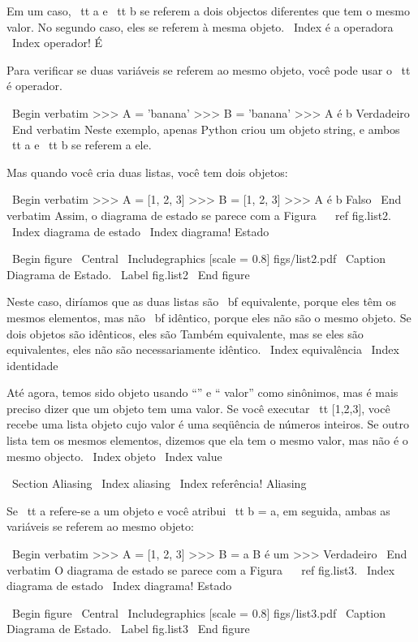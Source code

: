 \documentclass[10pt]{book}
\begin{document}
\begin {itemize}
{{{{{{{Em um caso, {\ tt a} e {\ tt b} se referem a dois objectos diferentes que
tem o mesmo valor. No segundo caso, eles se referem à mesma
objeto.
\ Index {} é a operadora
\ Index {operador! É}

Para verificar se duas variáveis ​​se referem ao mesmo objeto, você pode
usar o {\ tt é} operador.

\ Begin {verbatim}
>>> A = 'banana'
>>> B = 'banana'
>>> A é b
Verdadeiro
\ End {verbatim}
%
Neste exemplo, apenas Python criou um objeto string,
e ambos {\ tt a} e {\ tt b} se referem a ele.

Mas quando você cria duas listas, você tem dois objetos:

\ Begin {verbatim}
>>> A = [1, 2, 3]
>>> B = [1, 2, 3]
>>> A é b
Falso
\ End {verbatim}
%
Assim, o diagrama de estado se parece com a Figura ~ \ ref {} fig.list2.
\ Index {diagrama de estado}
\ Index {diagrama! Estado}

\ Begin {figure}
\ Central
{\ Includegraphics [scale = 0.8] {figs/list2.pdf}}
\ Caption {Diagrama de Estado.}
\ Label {} fig.list2
\ End {figure}


Neste caso, diríamos que as duas listas são {\ bf equivalente},
porque eles têm os mesmos elementos, mas não {\ bf idêntico}, porque
eles não são o mesmo objeto. Se dois objetos são idênticos, eles são
Também equivalente, mas se eles são equivalentes, eles não são necessariamente
idêntico.
\ Index {equivalência}
\ Index {identidade}

Até agora, temos sido objeto usando ``'' e `` valor''
como sinônimos, mas é mais preciso dizer que um objeto tem uma
valor. Se você executar {\ tt [1,2,3]}, você recebe uma lista
objeto cujo valor é uma seqüência de números inteiros. Se outro
lista tem os mesmos elementos, dizemos que ela tem o mesmo valor, mas
não é o mesmo objecto.
\ Index {objeto}
\ Index {value}


\ Section {} Aliasing
\ Index {aliasing}
\ Index {referência! Aliasing}

Se {\ tt a} refere-se a um objeto e você atribui {\ tt b = a},
em seguida, ambas as variáveis ​​se referem ao mesmo objeto:

\ Begin {verbatim}
>>> A = [1, 2, 3]
>>> B = a
B é um >>>
Verdadeiro
\ End {verbatim}
%
O diagrama de estado se parece com a Figura ~ \ ref {} fig.list3.
\ Index {diagrama de estado}
\ Index {diagrama! Estado}

\ Begin {figure}
\ Central
{\ Includegraphics [scale = 0.8] {figs/list3.pdf}}
\ Caption {Diagrama de Estado.}
\ Label {} fig.list3
\ End {figure}

}}}}}}}
\end{itemize}
\end{document}
